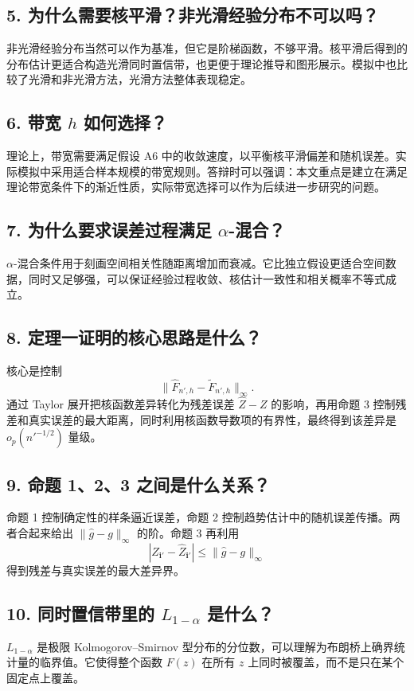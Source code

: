 \documentclass[UTF8,12pt]{ctexart}
\begin{document}
\subsection*{5. 为什么需要核平滑？非光滑经验分布不可以吗？}
非光滑经验分布当然可以作为基准，但它是阶梯函数，不够平滑。核平滑后得到的分布估计更适合构造光滑同时置信带，也更便于理论推导和图形展示。模拟中也比较了光滑和非光滑方法，光滑方法整体表现稳定。

\subsection*{6. 带宽 \(h\) 如何选择？}
理论上，带宽需要满足假设 A6 中的收敛速度，以平衡核平滑偏差和随机误差。实际模拟中采用适合样本规模的带宽规则。答辩时可以强调：本文重点是建立在满足理论带宽条件下的渐近性质，实际带宽选择可以作为后续进一步研究的问题。

\subsection*{7. 为什么要求误差过程满足 \(\alpha\)-混合？}
\(\alpha\)-混合条件用于刻画空间相关性随距离增加而衰减。它比独立假设更适合空间数据，同时又足够强，可以保证经验过程收敛、核估计一致性和相关概率不等式成立。

\subsection*{8. 定理一证明的核心思路是什么？}
核心是控制
\[
\|\hat F_{n',h}-\tilde F_{n',h}\|_\infty.
\]
通过 Taylor 展开把核函数差异转化为残差误差 \(\hat Z-Z\) 的影响，再用命题 3 控制残差和真实误差的最大距离，同时利用核函数导数项的有界性，最终得到该差异是 \(o_p(n'^{-1/2})\) 量级。

\subsection*{9. 命题 1、2、3 之间是什么关系？}
命题 1 控制确定性的样条逼近误差，命题 2 控制趋势估计中的随机误差传播。两者合起来给出 \(\|\hat g-g\|_\infty\) 的阶。命题 3 再利用
\[
|Z_{\mathbf{i}'}-\hat Z_{\mathbf{i}'}|\le \|\hat g-g\|_\infty
\]
得到残差与真实误差的最大差异界。

\subsection*{10. 同时置信带里的 \(L_{1-\alpha}\) 是什么？}
\(L_{1-\alpha}\) 是极限 Kolmogorov--Smirnov 型分布的分位数，可以理解为布朗桥上确界统计量的临界值。它使得整个函数 \(F(z)\) 在所有 \(z\) 上同时被覆盖，而不是只在某个固定点上覆盖。
\end{document}

